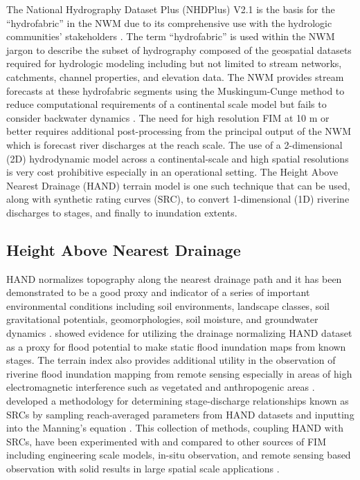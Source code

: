\documentclass[draft]{dependencies/agujournal2019}
\begin{document}
The National Hydrography Dataset Plus (NHDPlus) V2.1 is the basis for the ``hydrofabric'' in the NWM due to its comprehensive use with the hydrologic communities' stakeholders \cite{mckay2012nhdplus,nhdplus2022vectors}. 
The term ``hydrofabric'' is used within the NWM jargon to describe the subset of hydrography composed of the geospatial datasets required for hydrologic modeling including but not limited to stream networks, catchments, channel properties, and elevation data. 
The NWM provides stream forecasts at these hydrofabric segments using the Muskingum-Cunge method to reduce computational requirements of a continental scale model but fails to consider backwater dynamics \cite{bedient2008hydrology,ponce1994variable,gochis2021wrf}.
The need for high resolution FIM at 10 m or better requires additional post-processing from the principal output of the NWM which is forecast river discharges at the reach scale.
The use of a 2-dimensional (2D) hydrodynamic model across a continental-scale and high spatial resolutions is very cost prohibitive especially in an operational setting.
The Height Above Nearest Drainage (HAND) terrain model is one such technique that can be used, along with synthetic rating curves (SRC), to convert 1-dimensional (1D) riverine discharges to stages, and finally to inundation extents.
%
\subsection{Height Above Nearest Drainage}
%
HAND normalizes topography along the nearest drainage path and it has been demonstrated to be a good proxy and indicator of a series of important environmental conditions including soil environments, landscape classes, soil gravitational potentials, geomorphologies, soil moisture, and groundwater dynamics \cite{renno2008hand,nobre2011height}. 
 showed evidence for utilizing the drainage normalizing HAND dataset as a proxy for flood potential to make static flood inundation maps from known stages.
The terrain index also provides additional utility in the observation of riverine flood inundation mapping from remote sensing especially in areas of high electromagnetic interference such as vegetated and anthropogenic areas \cite{aristizabal2020high,shastry2019using,huang2017comparison,twele2016sentinel,aristizabal2021mapping}.
 developed a methodology for determining stage-discharge relationships known as SRCs by sampling reach-averaged parameters from HAND datasets and inputting into the Manning's equation \cite{gauckler1867etudes,manning1890flow}.
This collection of methods, coupling HAND with SRCs, have been experimented with and compared to other sources of FIM including engineering scale models, in-situ observation, and remote sensing based observation with solid results in large spatial scale applications \cite{godbout2019error,johnson2019integrated,garousi2019terrain,nobre2016hand,afshari2018comparison,zheng2018geoflood,teng2015rapid,teng2017flood,zhang2018comparative,hocini2020performance}.
%
\end{document}
